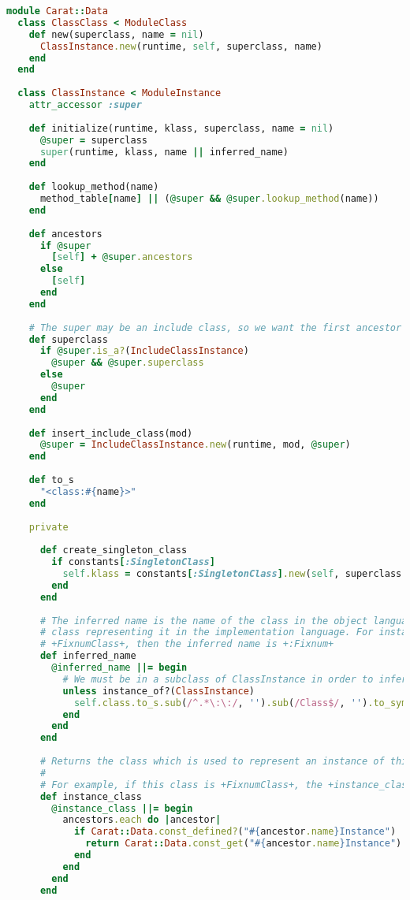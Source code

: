 \begin{lstlisting}[title={\small\Helvetica data/class.rb},language=Ruby]
module Carat::Data
  class ClassClass < ModuleClass
    def new(superclass, name = nil)
      ClassInstance.new(runtime, self, superclass, name)
    end
  end
  
  class ClassInstance < ModuleInstance
    attr_accessor :super
    
    def initialize(runtime, klass, superclass, name = nil)
      @super = superclass
      super(runtime, klass, name || inferred_name)
    end
    
    def lookup_method(name)
      method_table[name] || (@super && @super.lookup_method(name))
    end
    
    def ancestors
      if @super
        [self] + @super.ancestors
      else
        [self]
      end
    end
    
    # The super may be an include class, so we want the first ancestor which is a "proper" class
    def superclass
      if @super.is_a?(IncludeClassInstance)
        @super && @super.superclass
      else
        @super
      end
    end
    
    def insert_include_class(mod)
      @super = IncludeClassInstance.new(runtime, mod, @super)
    end
    
    def to_s
      "<class:#{name}>"
    end
    
    private
    
      def create_singleton_class
        if constants[:SingletonClass]
          self.klass = constants[:SingletonClass].new(self, superclass && superclass.singleton_class)
        end
      end
      
      # The inferred name is the name of the class in the object language, taken from the name of the
      # class representing it in the implementation language. For instance, if this is an instance of
      # +FixnumClass+, then the inferred name is +:Fixnum+
      def inferred_name
        @inferred_name ||= begin
          # We must be in a subclass of ClassInstance in order to infer a name
          unless instance_of?(ClassInstance)
            self.class.to_s.sub(/^.*\:\:/, '').sub(/Class$/, '').to_sym
          end
        end
      end
      
      # Returns the class which is used to represent an instance of this class.
      # 
      # For example, if this class is +FixnumClass+, the +instance_class+ will be +FixnumInstance+
      def instance_class
        @instance_class ||= begin
          ancestors.each do |ancestor|
            if Carat::Data.const_defined?("#{ancestor.name}Instance")
              return Carat::Data.const_get("#{ancestor.name}Instance")
            end
          end
        end
      end
    

\end{lstlisting}
